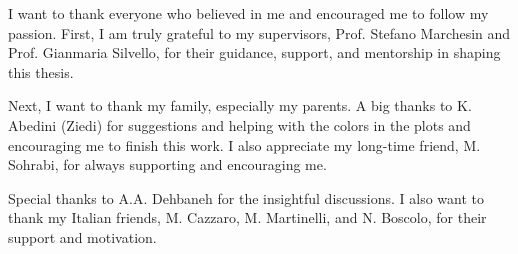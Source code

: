 I want to thank everyone who believed in me and encouraged me to follow my passion.
First, I am truly grateful to my supervisors, Prof. Stefano Marchesin and Prof. Gianmaria Silvello, for their guidance, support, and mentorship in shaping this thesis.

Next, I want to thank my family, especially my parents.
A big thanks to K. Abedini (\ie Ziedi) for suggestions and helping with the colors in the plots and encouraging me to finish this work.
I also appreciate my long-time friend, M. Sohrabi, for always supporting and encouraging me.

Special thanks to A.A. Dehbaneh for the insightful discussions.
I also want to thank my Italian friends, M. Cazzaro, M. Martinelli, and N. Boscolo, for their support and motivation.